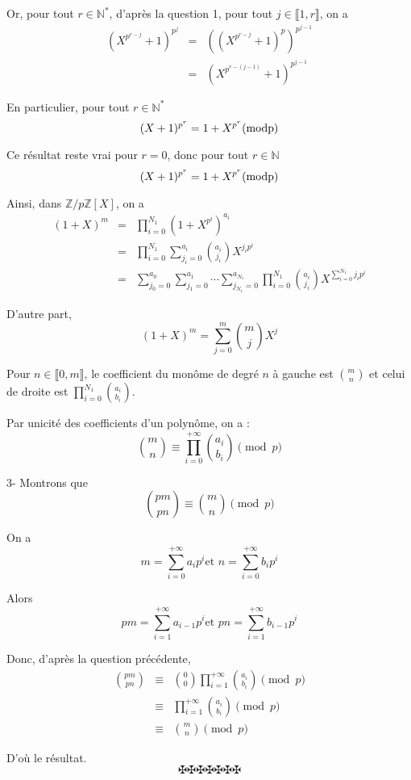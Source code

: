 Or, pour tout $r \in \mathbb{N}^{\ast}$, d'apr{\`e}s la question 1, pour tout
$j \in \llbracket 1, r \rrbracket$, on a
\begin{eqnarray*}
  (X^{p^{r - j}} + 1)^{p^j} & = & ((X^{p^{r - j}} + 1)^p)^{p^{j - 1}}\\
  & = & (X^{p^{r - (j - 1)}} + 1)^{p^{j - 1}}
\end{eqnarray*}


En particulier, pour tout $r \in \mathbb{N}^{\ast}$
\[ (X + 1)^{p^r} = 1 + X^{p^r} (\operatorname{modp}) \]


Ce r{\'e}sultat reste vrai pour $r = 0$, donc pour tout $r \in \mathbb{N}$
\[ (X + 1)^{p^r} = 1 + X^{p^r} (\operatorname{modp}) \]


Ainsi, dans $\mathbb{Z}/ p\mathbb{Z}[X]$, on a
\begin{eqnarray*}
  (1 + X)^m & = & \prod_{i = 0}^{N_1} (1 + X^{p^i})^{a_i}\\
  & = & \prod_{i = 0}^{N_1} \sum_{j_i = 0}^{a_i} \binom{a_i}{j_i} X^{j_i
  p^i}\\
  & = & \sum_{j_0 = 0}^{a_0} \sum_{j_1 = 0}^{a_1} \cdots \sum_{j_{N_1} =
  0}^{a_{N_1}} \prod_{i = 0}^{N_1} \binom{a_i}{j_i} X^{\sum_{i = 0}^{N_1} j_i
  p^i}
\end{eqnarray*}


D'autre part,
\[ (1 + X)^m = \sum_{j = 0}^m \binom{m}{j} X^j \]


Pour $n \in \llbracket 0, m \rrbracket$, le coefficient du mon{\^o}me de
degr{\'e} $n$ {\`a} gauche est $\binom{m}{n}$ et celui de droite est $\prod_{i
= 0}^{N_1} \binom{a_i}{b_i}$.

Par unicit{\'e} des coefficients d'un polyn{\^o}me, on a :
\[ \  \]
\[ \binom{m}{n} \equiv \prod_{i = 0}^{+ \infty} \binom{a_i}{b_i} \pmod{p} \]


3- Montrons que
\[ \binom{pm}{pn} \equiv \binom{m}{n} \pmod{p} \]


On a
\[ m = \sum_{i = 0}^{+ \infty} a_i p^i  \text{et } n = \sum_{i = 0}^{+ \infty}
   b_i p^i \]


Alors
\[ pm = \sum_{i = 1}^{+ \infty} a_{i - 1} p^i  \text{et } pn = \sum_{i = 1}^{+
   \infty} b_{i - 1} p^i \]


Donc, d'apr{\`e}s la question pr{\'e}c{\'e}dente,
\begin{eqnarray*}
  \binom{pm}{pn} & \equiv & \binom{0}{0} \prod_{i = 1}^{+ \infty}
  \binom{a_i}{b_i} \pmod{p}\\
  & \equiv & \prod_{i = 1}^{+ \infty} \binom{a_i}{b_i} \pmod{p}\\
  & \equiv & \binom{m}{n} \pmod{p}
\end{eqnarray*}


D'o{\`u} le r{\'e}sultat.
\[ \maltese \maltese \maltese \maltese \maltese \maltese \maltese \]

